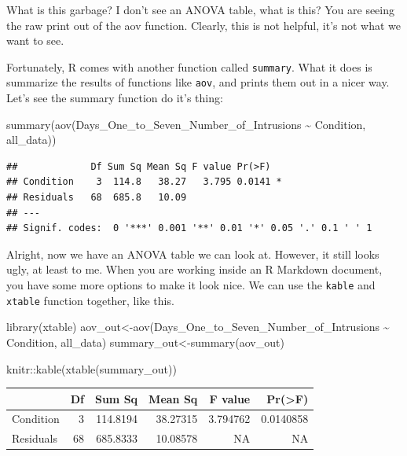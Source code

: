 \documentclass[
]{book}
\newenvironment{Shaded}{\begin{snugshade}}{\end{snugshade}}
\newcommand{\FunctionTok}[1]{\textcolor[rgb]{0.00,0.00,0.00}{#1}}
\newcommand{\NormalTok}[1]{#1}
\newcommand{\OtherTok}[1]{\textcolor[rgb]{0.56,0.35,0.01}{#1}}
\newcommand{\SpecialCharTok}[1]{\textcolor[rgb]{0.00,0.00,0.00}{#1}}
\begin{document}
What is this garbage? I don't see an ANOVA table, what is this? You are seeing the raw print out of the aov function. Clearly, this is not helpful, it's not what we want to see.

Fortunately, R comes with another function called \texttt{summary}. What it does is summarize the results of functions like \texttt{aov}, and prints them out in a nicer way. Let's see the summary function do it's thing:

\begin{Shaded}
\begin{Highlighting}[]
\FunctionTok{summary}\NormalTok{(}\FunctionTok{aov}\NormalTok{(Days\_One\_to\_Seven\_Number\_of\_Intrusions }\SpecialCharTok{\textasciitilde{}}\NormalTok{ Condition, all\_data))}
\end{Highlighting}
\end{Shaded}

\begin{verbatim}
##             Df Sum Sq Mean Sq F value Pr(>F)  
## Condition    3  114.8   38.27   3.795 0.0141 *
## Residuals   68  685.8   10.09                 
## ---
## Signif. codes:  0 '***' 0.001 '**' 0.01 '*' 0.05 '.' 0.1 ' ' 1
\end{verbatim}

Alright, now we have an ANOVA table we can look at. However, it still looks ugly, at least to me. When you are working inside an R Markdown document, you have some more options to make it look nice. We can use the \texttt{kable} and \texttt{xtable} function together, like this.

\begin{Shaded}
\begin{Highlighting}[]
\FunctionTok{library}\NormalTok{(xtable)}
\NormalTok{aov\_out}\OtherTok{\textless{}{-}}\FunctionTok{aov}\NormalTok{(Days\_One\_to\_Seven\_Number\_of\_Intrusions }\SpecialCharTok{\textasciitilde{}}\NormalTok{ Condition, all\_data)}
\NormalTok{summary\_out}\OtherTok{\textless{}{-}}\FunctionTok{summary}\NormalTok{(aov\_out)}

\NormalTok{knitr}\SpecialCharTok{::}\FunctionTok{kable}\NormalTok{(}\FunctionTok{xtable}\NormalTok{(summary\_out))}
\end{Highlighting}
\end{Shaded}

\begin{tabular}{l|r|r|r|r|r}
\hline
  & Df & Sum Sq & Mean Sq & F value & Pr(>F)\\
\hline
Condition & 3 & 114.8194 & 38.27315 & 3.794762 & 0.0140858\\
\hline
Residuals & 68 & 685.8333 & 10.08578 & NA & NA\\
\hline
\end{tabular}
\end{document}
